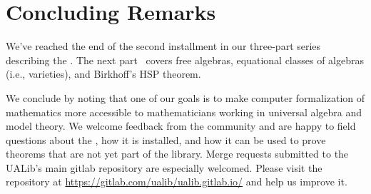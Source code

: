 \section{Concluding Remarks}\label{sec:concluding-remarks}
We've reached the end of the second installment in our three-part series describing
the \agdaualib.  The next part~\cite{DeMeo:2021-3} covers free algebras,
equational classes of algebras (i.e., varieties), and Birkhoff's HSP theorem. 



We conclude by noting that one of our goals is to make computer formalization of
mathematics more accessible to mathematicians working in universal algebra and
model theory. We welcome feedback from the community and are happy to field
questions about the \ualib, how it is installed, and how it can be used to prove
theorems that are not yet part of the library.  Merge requests submitted to the
UALib's main gitlab repository are especially welcomed.  Please visit the
repository at \url{https://gitlab.com/ualib/ualib.gitlab.io/} and help us
improve it. 



